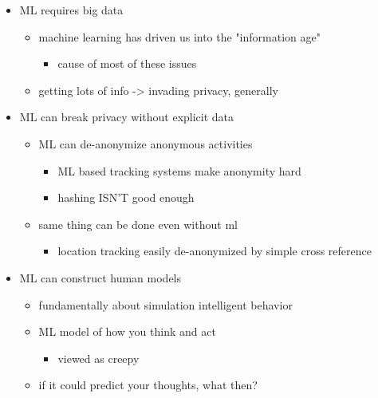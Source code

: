 \documentclass[letterpaper]{article}
\begin{document}
\begin{itemize}
\item ML requires big data

\begin{itemize}
\item machine learning has driven us into the "information age"

\begin{itemize}
\item cause of most of these issues
\end{itemize}

\item getting lots of info -> invading privacy, generally
\end{itemize}

\item ML can break privacy without explicit data

\begin{itemize}
\item ML can de-anonymize anonymous activities

\begin{itemize}
\item ML based tracking systems make anonymity hard
\item hashing ISN'T good enough
\end{itemize}

\item same thing can be done even without ml

\begin{itemize}
\item location tracking easily de-anonymized by simple cross reference
\end{itemize}
\end{itemize}

\item ML can construct human models

\begin{itemize}
\item fundamentally about simulation intelligent behavior
\item ML model of how you think and act

\begin{itemize}
\item viewed as creepy
\end{itemize}

\item if it could predict your thoughts, what then?
\end{itemize}
\end{itemize}
\end{document}
